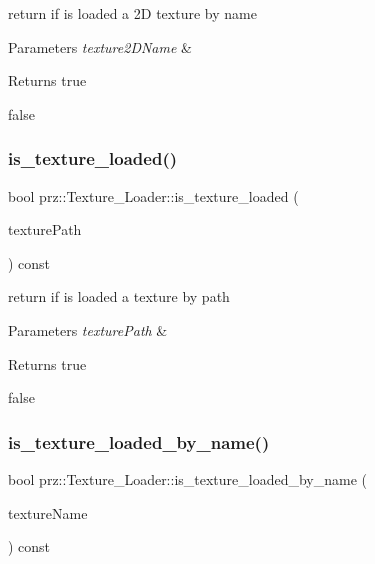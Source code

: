 return if is loaded a 2D texture by name 


\begin{DoxyParams}{Parameters}
{\em texture2\+D\+Name} & \\
\hline
\end{DoxyParams}
\begin{DoxyReturn}{Returns}
true 

false 
\end{DoxyReturn}
\mbox{\label{classprz_1_1_texture___loader_aea5eb425e3e4b39767fcf224415686ba}} 
\subsubsection{\texorpdfstring{is\_texture\_loaded()}{is\_texture\_loaded()}}
{\footnotesize\ttfamily bool prz\+::\+Texture\+\_\+\+Loader\+::is\+\_\+texture\+\_\+loaded (\begin{DoxyParamCaption}\item[{const P\+String \&}]{texture\+Path }\end{DoxyParamCaption}) const\hspace{0.3cm}{\ttfamily [inline]}}



return if is loaded a texture by path 


\begin{DoxyParams}{Parameters}
{\em texture\+Path} & \\
\hline
\end{DoxyParams}
\begin{DoxyReturn}{Returns}
true 

false 
\end{DoxyReturn}
\mbox{\label{classprz_1_1_texture___loader_ac824d4884c5ba02477f60e296ae21e1c}} 
\subsubsection{\texorpdfstring{is\_texture\_loaded\_by\_name()}{is\_texture\_loaded\_by\_name()}}
{\footnotesize\ttfamily bool prz\+::\+Texture\+\_\+\+Loader\+::is\+\_\+texture\+\_\+loaded\+\_\+by\+\_\+name (\begin{DoxyParamCaption}\item[{const P\+String \&}]{texture\+Name }\end{DoxyParamCaption}) const\hspace{0.3cm}{\ttfamily [inline]}}



